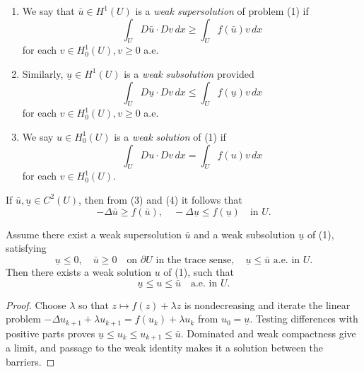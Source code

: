 \begin{definition}
\label{def:weak-sub-supersolution}
\begin{enumerate}
\item[(i)] We say that $\bar{u} \in H^1(U)$ is a \textit{weak supersolution} of problem (1) if
\[
\int_U D\bar{u} \cdot Dv \, dx \geq \int_U f(\bar{u})v \, dx
\tag{3}
\]
for each $v \in H^1_0(U), v \geq 0$ a.e.
\item[(ii)] Similarly, $\underline{u} \in H^1(U)$ is a \textit{weak subsolution} provided
\[
\int_U D\underline{u} \cdot Dv \, dx \leq \int_U f(\underline{u})v \, dx
\tag{4}
\]
for each $v \in H^1_0(U), v \geq 0$ a.e.
\item[(iii)] We say $u \in H^1_0(U)$ is a \textit{weak solution} of (1) if
\[
\int_U Du \cdot Dv \, dx = \int_U f(u)v \, dx
\]
for each $v \in H^1_0(U)$.
\end{enumerate}
\end{definition}

\begin{remark}
\label{rem:sub-supersolution-c2-case}
If $\bar{u}, \underline{u} \in C^2(U)$, then from (3) and (4) it follows that
\[
-\Delta \bar{u} \geq f(\bar{u}), \quad -\Delta \underline{u} \leq f(\underline{u}) \quad \text{in } U.
\]
\end{remark}

\begin{theorem}
\label{thm:existence-between-sub-supersolutions}
Assume there exist a weak supersolution $\bar{u}$ and a weak subsolution $\underline{u}$ of (1), satisfying
\[
\underline{u} \leq 0, \quad \bar{u} \geq 0 \quad \text{on } \partial U \text{ in the trace sense}, \quad \underline{u} \leq \bar{u} \text{ a.e. in } U.
\tag{5}
\]
Then there exists a weak solution $u$ of (1), such that
\[
\underline{u} \leq u \leq \bar{u} \quad \text{a.e. in } U.
\]
\end{theorem}

\begin{proof}
\sketch Choose $\lambda$ so that $z\mapsto f(z)+\lambda z$ is nondecreasing and iterate the linear problem $-\Delta u_{k+1}+\lambda u_{k+1}=f(u_k)+\lambda u_k$ from $u_0=\underline u$. Testing differences with positive parts proves $\underline u\leq u_k\leq u_{k+1}\leq\bar u$. Dominated and weak compactness give a limit, and passage to the weak identity makes it a solution between the barriers.
\end{proof}

